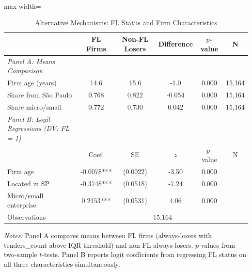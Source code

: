 \begin{table}[htbp]
\centering
\caption{Alternative Mechanisms: FL Status and Firm Characteristics}
\label{tab:alternative_mechanisms}
\begin{adjustbox}{max width=\textwidth}
\begin{threeparttable}
\small
\begin{tabular}{lccccc}
\toprule
 & FL Firms & Non-FL Losers & Difference & $p$-value & N \\
\midrule
\textit{Panel A: Means Comparison} & & & & & \\
Firm age (years) & 14.6 & 15.6 & -1.0 & 0.000 & 15,164 \\
Share from S\~{a}o Paulo & 0.768 & 0.822 & -0.054 & 0.000 & 15,164 \\
Share micro/small & 0.772 & 0.730 & 0.042 & 0.000 & 15,164 \\
\midrule
\textit{Panel B: Logit Regressions (DV: FL = 1)} & & & & & \\
 & Coef. & SE & $z$ & $p$-value & N \\
\midrule
Firm age & -0.0078*** & (0.0022) & -3.50 & 0.000 & \\
Located in SP & -0.3748*** & (0.0518) & -7.24 & 0.000 & \\
Micro/small enterprise & 0.2153*** & (0.0531) & 4.06 & 0.000 & \\
Observations & \multicolumn{5}{c}{15,164} \\
\bottomrule
\end{tabular}
\begin{tablenotes}
\small
\item \textit{Notes:} Panel A compares means between FL firms (always-losers with
tenders\_count above IQR threshold) and non-FL always-losers. $p$-values from
two-sample $t$-tests. Panel B reports logit coefficients from regressing FL
status on all three characteristics simultaneously.
\end{tablenotes}
\end{threeparttable}
\end{adjustbox}
\end{table}
